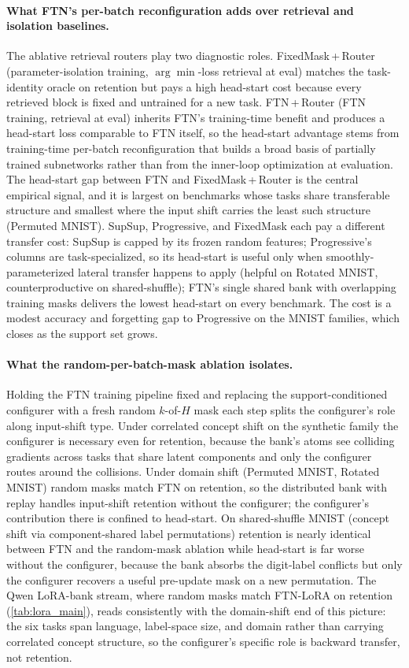 \documentclass[11pt]{article}
\begin{document}
\paragraph{What FTN's per-batch reconfiguration adds over retrieval and isolation baselines.}
The ablative retrieval routers play two diagnostic roles. FixedMask\,+\,Router (parameter-isolation training, $\arg\min$-loss retrieval at eval) matches the task-identity oracle on retention but pays a high head-start cost because every retrieved block is fixed and untrained for a new task. FTN\,+\,Router (FTN training, retrieval at eval) inherits FTN's training-time benefit and produces a head-start loss comparable to FTN itself, so the head-start advantage stems from training-time per-batch reconfiguration that builds a broad basis of partially trained subnetworks rather than from the inner-loop optimization at evaluation. The head-start gap between FTN and FixedMask\,+\,Router is the central empirical signal, and it is largest on benchmarks whose tasks share transferable structure and smallest where the input shift carries the least such structure (Permuted MNIST). SupSup, Progressive, and FixedMask each pay a different transfer cost: SupSup is capped by its frozen random features; Progressive's columns are task-specialized, so its head-start is useful only when smoothly-parameterized lateral transfer happens to apply (helpful on Rotated MNIST, counterproductive on shared-shuffle); FTN's single shared bank with overlapping training masks delivers the lowest head-start on every benchmark. The cost is a modest accuracy and forgetting gap to Progressive on the MNIST families, which closes as the support set grows.

\paragraph{What the random-per-batch-mask ablation isolates.}
Holding the FTN training pipeline fixed and replacing the support-conditioned configurer with a fresh random $k$-of-$H$ mask each step splits the configurer's role along input-shift type. Under correlated concept shift on the synthetic family the configurer is necessary even for retention, because the bank's atoms see colliding gradients across tasks that share latent components and only the configurer routes around the collisions. Under domain shift (Permuted MNIST, Rotated MNIST) random masks match FTN on retention, so the distributed bank with replay handles input-shift retention without the configurer; the configurer's contribution there is confined to head-start. On shared-shuffle MNIST (concept shift via component-shared label permutations) retention is nearly identical between FTN and the random-mask ablation while head-start is far worse without the configurer, because the bank absorbs the digit-label conflicts but only the configurer recovers a useful pre-update mask on a new permutation. The Qwen LoRA-bank stream, where random masks match FTN-LoRA on retention (\cref{tab:lora_main}), reads consistently with the domain-shift end of this picture: the six tasks span language, label-space size, and domain rather than carrying correlated concept structure, so the configurer's specific role is backward transfer, not retention.
\end{document}
